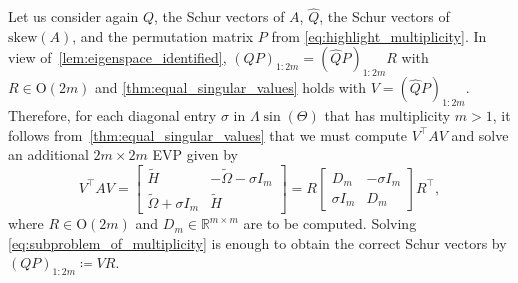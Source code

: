 \documentclass[10pt,twoside,dvipsnames]{siamart1116}
\numberwithin{algorithm}{section}
\numberwithin{equation}{section}
\begin{document}
	 Let us consider again $Q$, the Schur vectors of $A$, $\widehat{Q}$, the Schur vectors of $\mathrm{skew}(A)$, %
	 and the permutation matrix $P$ from \eqref{eq:highlight_multiplicity}. In view of~\cref{lem:eigenspace_identified}, $(QP)_{1:2m}  = (\widehat{Q}P)_{1:2m} R$ with $R\in\mathrm{O}(2m)$ and \cref{thm:equal_singular_values} holds with $V=(\widehat {Q}P)_{1:2m}$. 
 Therefore, for each diagonal entry $\sigma$ in $\Lambda\sin(\Theta)$ that has multiplicity $m>1$, it follows from~\cref{thm:equal_singular_values} that we must compute $V^\top AV$ and solve an additional $2m\times 2m$ EVP given by
	\begin{equation}\label{eq:subproblem_of_multiplicity}
			V^\top AV=\begin{bmatrix}
	\widetilde{H}&-\widetilde{\Omega}-\sigma I_m\\
	\widetilde{\Omega}+\sigma I_m&\widetilde{H}
	\end{bmatrix} = R\begin{bmatrix}
	 D_m&-\sigma I_m\\
	 \sigma I_m&D_m
	 \end{bmatrix}R^\top ,
		\end{equation}
		where $R\in\mathrm{O}(2m)$ and $D_m\in\mathbb{R}^{m\times m}$ are to be computed.
		Solving \eqref{eq:subproblem_of_multiplicity} is enough to obtain the correct Schur vectors by $(QP)_{1:2m}  \coloneq V R$.%
\end{document}
